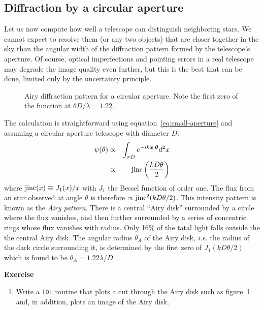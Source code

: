 \documentclass{article}
\newcommand{\bua}{\begin{eqnarray*}}
\newcommand{\eua}{\end{eqnarray*}}
\begin{document}
\subsection*{Diffraction by a circular aperture}

Let us now compute how well a telescope can distinguish neighboring stars. We cannot expect to
resolve them (or any two objects) that are closer together in the sky than the angular width
of the diffraction pattern formed by the telescope's aperture. Of course, optical imperfections
and pointing errors in a real telescope may degrade the image quality even further, but this
is the best that can be done, limited only by the uncertainty principle.

\begin{figure}[th!]
  \hfil{}\hfil
  \caption{Airy diffraction pattern for a circular aperture. Note the first zero
of the function at $\theta D/\lambda=1.22$.}
  \label{fig:jinc2}
\end{figure}

The calculation is straightforward using equation~\ref{eq:small-aperture} and assuming a circular
aperture telescope with diameter $D$:
\bua
\psi(\theta)&\propto&\int_{\pi D}e^{-ik{\bm x}\cdot{\bm\theta}}d^2x \\
            &\propto&{\rm jinc}\left({kD\theta\over 2}\right)
\eua
where ${\rm jinc}(x)\equiv {J_1(x)/x}$ with $J_1$ the Bessel function of order one. The
flux from an star observed at angle $\theta$ is therefore $\propto{\rm jinc}^2({kD\theta/2})$.
This intensity pattern is known as the {\it Airy pattern}. There is a central ``Airy disk'' 
surrounded by a circle where the flux vanishes, and then further surrounded by a series of 
concentric rings whose flux vanishes with radius. Only 16\% of the tatal light falls outside
the the central Airy disk. The angular radius $\theta_A$ of the Airy disk, {\it i.e.} the 
radius of the dark circle surrounding it, is determined by the first zero of 
$J_1({kD\theta/2})$ which is found to be $\theta_A={1.22\lambda/D}$. 

{\bf Exercise}

\begin{enumerate}
\setcounter{enumi}{\value{count}}
\item Write a {\tt IDL} routine that plots a cut through the Airy disk such as figure~\ref{fig:jinc2}
and, in addition, plots an image of the Airy disk.
\setcounter{count}{\value{enumi}}
\end{enumerate}
\end{document}
